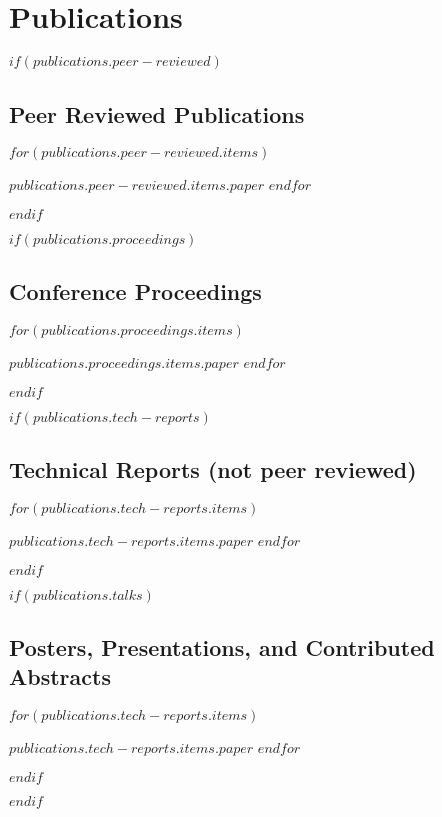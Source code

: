 \documentclass[letterpaper,10pt,final]{moderncv}
\begin{document}
\section{Publications}
$if(publications.peer-reviewed)$
\subsection{Peer Reviewed Publications}
\vspace*{0.25em}
\begin{list}{}{\leftmargin=1em \itemindent=-1em \itemsep=0.25em}
$for(publications.peer-reviewed.items)$
\item $publications.peer-reviewed.items.paper$
$endfor$
\end{list}
$endif$

$if(publications.proceedings)$
\subsection{Conference Proceedings}
\vspace*{0.25em}
\begin{list}{}{\leftmargin=1em \itemindent=-1em \itemsep=0.25em}
$for(publications.proceedings.items)$
\item $publications.proceedings.items.paper$
$endfor$
\end{list}
$endif$

$if(publications.tech-reports)$
\subsection{Technical Reports (not peer reviewed)}
\vspace*{0.25em}
\begin{list}{}{\leftmargin=1em \itemindent=-1em \itemsep=0.25em}
$for(publications.tech-reports.items)$
\item $publications.tech-reports.items.paper$
$endfor$
\end{list}
$endif$

$if(publications.talks)$
\subsection{Posters, Presentations, and Contributed Abstracts}
\vspace*{0.25em}
\begin{list}{}{\leftmargin=1em \itemindent=-1em \itemsep=0.25em}
$for(publications.tech-reports.items)$
\item $publications.tech-reports.items.paper$
$endfor$
\end{list}
$endif$

$endif$


\end{document}
